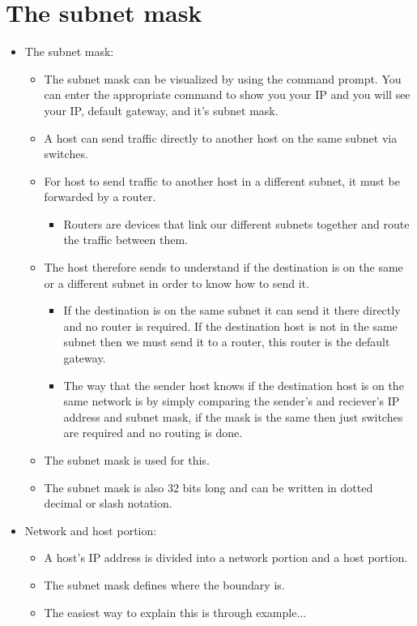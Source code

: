 \section{The subnet mask}
\begin{itemize}
    \item The subnet mask:
        \begin{itemize}
            \item The subnet mask can be visualized by using the command prompt. You can enter the appropriate command to show you your IP and you will see your IP, default gateway, and it's subnet mask.
            \item A host can send traffic directly to another host on the same subnet via switches.
            \item For host to send traffic to another host in a different subnet, it must be forwarded by a router.
                \begin{itemize}
                    \item Routers are devices that link our different subnets together and route the traffic between them.
                \end{itemize}
            \item The host therefore sends to understand if the destination is on the same or a different subnet in order to know how to send it.
                \begin{itemize}
                    \item If the destination is on the same subnet it can send it there directly and no router is required. If the destination host is not in the same subnet then we must send it to a router, this router is the default gateway. 
                    \item The way that the sender host knows if the destination host is on the same network is by simply comparing the sender's and reciever's IP address and subnet mask, if the mask is the same then just switches are required and no routing is done.
                \end{itemize}
            \item The subnet mask is used for this. 
            \item The subnet mask is also 32 bits long and can be written in dotted decimal or slash notation.
        \end{itemize}
    
    \item Network and host portion:
        \begin{itemize}
            \item A host's IP address is divided into a network portion and a host portion.
            \item The subnet mask defines where the boundary is.
            \item The easiest way to explain this is through example...
        \end{itemize}
    

\end{itemize}
